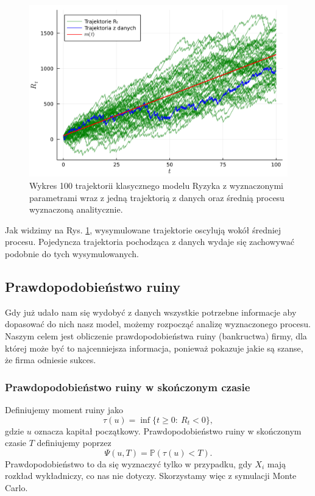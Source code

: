 \documentclass[12pt]{mwart}
\begin{document}
	\begin{figure}[H]
		\centering
		\includegraphics[width=\columnwidth]{fig/trajektorie_2.pdf}
		\caption{Wykres 100 trajektorii klasycznego modelu Ryzyka z wyznaczonymi parametrami wraz z jedną trajektorią z danych oraz średnią procesu wyznaczoną analitycznie.}
		\label{fig:trajektorie2}
	\end{figure}

	\noindent Jak widzimy na Rys. \ref{fig:trajektorie2}, wysymulowane trajektorie oscylują wokół średniej procesu. Pojedyncza trajektoria pochodząca z danych wydaje się zachowywać podobnie do tych wysymulowanych.
	
	
	
	\subsection{Prawdopodobieństwo ruiny}
	\noindent Gdy już udało nam się wydobyć z danych wszystkie potrzebne informacje aby dopasować do nich nasz model, możemy rozpocząć analizę wyznaczonego procesu. Naszym celem jest obliczenie prawdopodobieństwa ruiny (bankructwa) firmy, dla której może być to najcenniejsza informacja, ponieważ pokazuje jakie są szanse, że firma odniesie sukces.
	
	\subsubsection{Prawdopodobieństwo ruiny w skończonym czasie}
	\noindent Definiujemy moment ruiny jako
	$$ \tau(u) = \inf\{t \geq 0: \ R_t < 0\}, $$
	gdzie $u$ oznacza kapitał początkowy. Prawdopodobieństwo ruiny w skończonym czasie $T$ definiujemy poprzez
	$$ \Psi(u, T) = \mathbb{P}(\tau(u) < T). $$
	Prawdopodobieństwo to da się wyznaczyć tylko w przypadku, gdy $X_i$ mają rozkład wykładniczy, co nas nie dotyczy. Skorzystamy więc z symulacji Monte Carlo.\\
	
\end{document}
